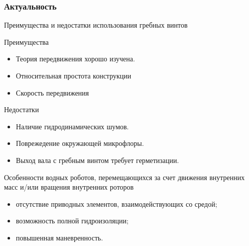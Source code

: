 \begin{frame}
\frametitle{Актуальность}
	
	Преимущества и недостатки использования гребных винтов
	\begin{minipage}[t]{0.49\linewidth}
		Преимущества
		\begin{itemize}
			\item Теория передвижения хорошо изучена.
			\item Относительная простота конструкции
			\item Скорость передвижения
		\end{itemize}
	\end{minipage}
	\hfill
	\begin{minipage}[t]{0.49\linewidth}
		Недостатки
		\begin{itemize}
			\item Наличие гидродинамических шумов.
			\item Поврежедение окружающей микрофлоры.
			\item Выход вала с гребным винтом требует герметизации.
		\end{itemize}
	\end{minipage}

	\vspace{2mm}
	
	Особенности водных роботов, перемещающихся за счет движения внутренних масс и/или вращения внутренних роторов%
		\begin{itemize}
			\item отсутствие приводных элементов, взаимодействующих со средой;
			\item возможность полной гидроизоляции;
			\item повышенная маневренность.
		\end{itemize}
		



\end{frame}

